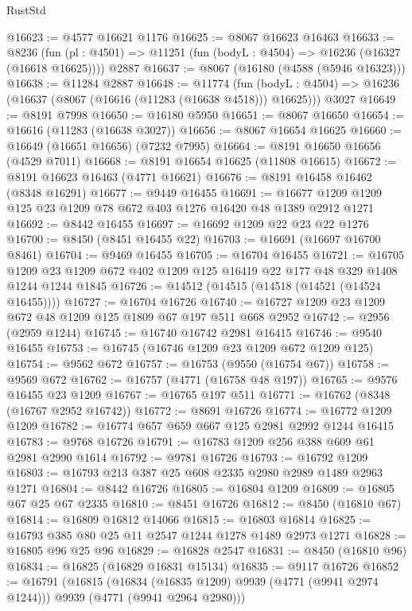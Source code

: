 \begin{lexlean}{RustStd}
\begin{coremodule}
@16623 := @4577 @16621 @1176
@16625 := @8067 @16623 @16463
@16633 := @8236
    (fun (pl : @4501) => @11251 (fun (bodyL : @4504) => @16236 (@16327 (@16618 @16625))))
    @2887
@16637 := @8067 (@16180 (@4588 (@5946 @16323)))
@16638 := @11284 @2887
@16648 := @11774
    (fun (bodyL : @4504) => @16236 (@16637 (@8067 (@16616 (@11283 (@16638 @4518))) @16625)))
    @3027
@16649 := @8191 @7998
@16650 := @16180 @5950
@16651 := @8067 @16650
@16654 := @16616 (@11283 (@16638 @3027))
@16656 := @8067 @16654 @16625
@16660 := @16649 (@16651 @16656) (@7232 @7995)
@16664 := @8191 @16650 @16656 (@4529 @7011)
@16668 := @8191 @16654 @16625 (@11808 @16615)
@16672 := @8191 @16623 @16463 (@4771 @16621)
@16676 := @8191 @16458 @16462 (@8348 @16291)
@16677 := @9449 @16455
@16691 := @16677 @1209 @1209 @125 @23 @1209 @78 @672 @403 @1276 @16420 @48 @1389 @2912 @1271
@16692 := @8442 @16455
@16697 := @16692 @1209 @22 @23 @22 @1276
@16700 := @8450 (@8451 @16455 @22)
@16703 := @16691 (@16697 @16700 @8461)
@16704 := @9469 @16455
@16705 := @16704 @16455
@16721 := @16705
    @1209
    @23
    @1209
    @672
    @402
    @1209
    @125
    @16419
    @22
    @177
    @48
    @329
    @1408
    @1244
    @1244
    @1845
@16726 := @14512 (@14515 (@14518 (@14521 (@14524 @16455))))
@16727 := @16704 @16726
@16740 := @16727 @1209 @23 @1209 @672 @48 @1209 @125 @1809 @67 @197 @511 @668 @2952
@16742 := @2956 (@2959 @1244)
@16745 := @16740 @16742 @2981 @16415
@16746 := @9540 @16455
@16753 := @16745 (@16746 @1209 @23 @1209 @672 @1209 @125)
@16754 := @9562 @672
@16757 := @16753 (@9550 (@16754 @67))
@16758 := @9569 @672
@16762 := @16757 (@4771 (@16758 @48 @197))
@16765 := @9576 @16455 @23 @1209
@16767 := @16765 @197 @511
@16771 := @16762 (@8348 (@16767 @2952 @16742))
@16772 := @8691 @16726
@16774 := @16772 @1209 @1209
@16782 := @16774 @657 @659 @667 @125 @2981 @2992 @1244 @16415
@16783 := @9768 @16726
@16791 := @16783 @1209 @256 @388 @609 @61 @2981 @2990 @1614
@16792 := @9781 @16726
@16793 := @16792 @1209
@16803 := @16793 @213 @387 @25 @608 @2335 @2980 @2989 @1489 @2963 @1271
@16804 := @8442 @16726
@16805 := @16804 @1209
@16809 := @16805 @67 @25 @67 @2335
@16810 := @8451 @16726
@16812 := @8450 (@16810 @67)
@16814 := @16809 @16812 @14066
@16815 := @16803 @16814
@16825 := @16793 @385 @80 @25 @11 @2547 @1244 @1278 @1489 @2973 @1271
@16828 := @16805 @96 @25 @96
@16829 := @16828 @2547
@16831 := @8450 (@16810 @96)
@16834 := @16825 (@16829 @16831 @15134)
@16835 := @9117 @16726
@16852 := @16791
    (@16815
      (@16834 (@16835 @1209) @9939 (@4771 (@9941 @2974 @1244)))
      @9939
      (@4771 (@9941 @2964 @2980)))

\end{coremodule}
\end{lexlean}
